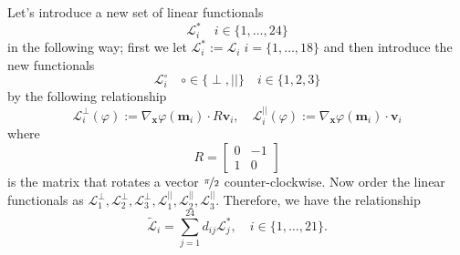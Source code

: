 Let's introduce a new set of linear functionals
\begin{equation*}
  \mathcal{L}^*_i \quad i\in\{1,\dots,24\}
\end{equation*}
in the following way; first we let $\mathcal{L}^*_i:=\mathcal{L}_i\;
i=\{1,\dots,18\}$ and then introduce the new functionals
\begin{equation*}
  \mathcal{L}^\circ_i \quad \circ \in \{\perp,||\}\quad i\in \{1,2,3\}
\end{equation*}
by the following relationship
\begin{equation*}
  \mathcal{L}_i^{\perp}(\varphi) := \nabla_{\mathbf{x}} \varphi(\mathbf{m}_i)
  \cdot R\mathbf{v}_i, \quad 
  \mathcal{L}^{||}_i (\varphi) := \nabla_{\mathbf{x}} \varphi(\mathbf{m}_i)
  \cdot \mathbf{v}_i
\end{equation*}
where 
\begin{equation*}
  R = \begin{bmatrix}
    0 & -1 \\ 1 & 0
  \end{bmatrix}
\end{equation*} 
is the matrix that rotates a vector $\nicefrac{\pi}{2}$ counter-clockwise. Now
order the linear functionals as
$\mathcal{L}^{\perp}_1,\mathcal{L}^{\perp}_2,\mathcal{L}^{\perp}_3,
\mathcal{L}^{||}_1,\mathcal{L}^{||}_2,\mathcal{L}^{||}_3$.
Therefore, we have the relationship 
\begin{equation}
  \tilde{\mathcal{L}}_i = \sum_{j=1}^{24} d_{ij} \mathcal{L}^*_j, \quad
    i\in\{1,\dots,21\}.
  \label{eqn:FunctionalsD}
\end{equation}

